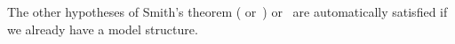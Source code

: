 \begin{verbose}
\begin{rmk}
    The other hypotheses of Smith's theorem (\cite[Theorem 1.7]{beke:sheafifiable} or~\cite[Proposition 1.7]{barwick:enr-localization}) or~\cite[Theorem 1.4.3]{cisinski:presheaves} are automatically satisfied if we already have a model structure.
\end{rmk}
\end{verbose}


